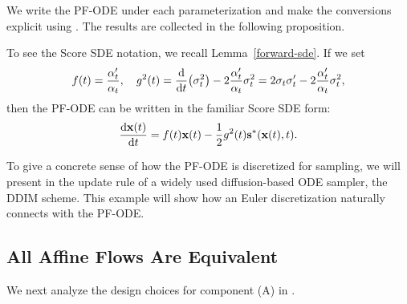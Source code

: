 We write the PF-ODE under each parameterization and make
the conversions explicit using . The
results are collected in the following proposition.

To see the Score SDE notation, we recall Lemma~\ref{forward-sde}.  If we set
\[
f(t) = \frac{\alpha_t'}{\alpha_t}, 
\quad
g^2(t) = \frac{\mathop{}\!\mathrm{d}}{\mathop{}\!\mathrm{d} t} \big(\sigma_t^2\big) 
         - 2 \frac{\alpha_t'}{\alpha_t} \sigma_t^2
       = 2\sigma_t\sigma_t' - 2 \frac{\alpha_t'}{\alpha_t} \sigma_t^2,
\]
then the PF-ODE can be written in the familiar Score SDE form:
\[
\frac{\mathop{}\!\mathrm{d} {\mathbf{x}}(t)}{\mathop{}\!\mathrm{d} t}
= f(t) {\mathbf{x}}(t)  -  \frac{1}{2} g^2(t) {\mathbf{s}}^*({\mathbf{x}}(t),t).
\]

To give a concrete sense of how the PF-ODE is discretized
for sampling, we will present in  the update rule of a
widely used diffusion-based ODE sampler, the DDIM scheme. This example will show how an Euler discretization naturally connects with the PF-ODE.







\subsection{All Affine Flows Are Equivalent}\label{subsec:all-flows-are-equiv}
We next analyze the design choices for component (A) in .

